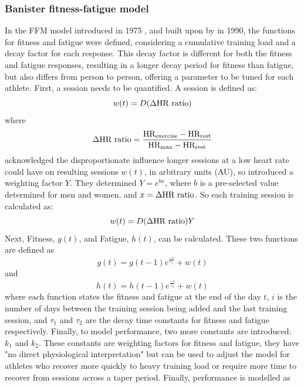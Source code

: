 \subsubsection{Banister fitness-fatigue model}
 In the FFM model introduced in 1975 \cite{Bannister1976}, and built upon by \textcite{Morton1990} in 1990, the functions for fitness and fatigue were defined, considering a cumulative training load and a decay factor for each response. This decay factor is different for both the fitness and fatigue responses, resulting in a longer decay period for fitness than fatigue, but also differs from person to person, offering a parameter to be tuned for each athlete. First, a session needs to be quantified. A session is defined as:
\begin{equation}\label{eq:ban_imp_base}
  w(t) = D (\Delta \textnormal{HR ratio})
\end{equation}
where
\begin{equation*}
  \Delta \textnormal{HR ratio} = \frac{\textnormal{HR}_\textnormal{exercise} - \textnormal{HR}_\textnormal{rest}}{\textnormal{HR}_\textnormal{max} - \textnormal{HR}_\textnormal{rest}}
\end{equation*}
\textcite{Morton1990} acknowledged the disproportionate influence longer sessions at a low heart rate could have on resulting sessions $w(t)$, in arbitrary units (AU), so introduced a weighting factor $Y$. They determined $Y = e^{bx}$, where $b$ is a pre-selected value determined for men and women, and $x = \Delta \textnormal{HR ratio}$. So each training session is calculated as:
\begin{equation}\label{eq:ban_impulse}
  w(t) = D (\Delta \textnormal{HR ratio})Y
\end{equation}
Next, Fitness, $g(t)$, and Fatigue, $h(t)$, can be calculated. These two functions are defined as
\begin{equation}\label{eq:ban_fit}
  g(t) = g(t - 1)e^\frac{-i}{\tau_1} + w(t)
\end{equation}
and
\begin{equation}\label{eq:ban_fat}
  h(t) = h(t - 1)e^\frac{-i}{\tau_2} + w(t)
\end{equation}
where each function states the fitness and fatigue at the end of the day $t$, $i$ is the number of days between the training session being added and the last training session, and $\tau_1$ and $\tau_2$ are the decay time constants for fitness and fatigue respectively. Finally, to model performance, two more constants are introduced: $k_1$ and $k_2$. These constants are weighting factors for fitness and fatigue, they have "no direct physiological interpretation" \cite{Morton1990} but can be used to adjust the model for athletes who recover more quickly to heavy training load or require more time to recover from sessions across a taper period. Finally, performance is modelled as
